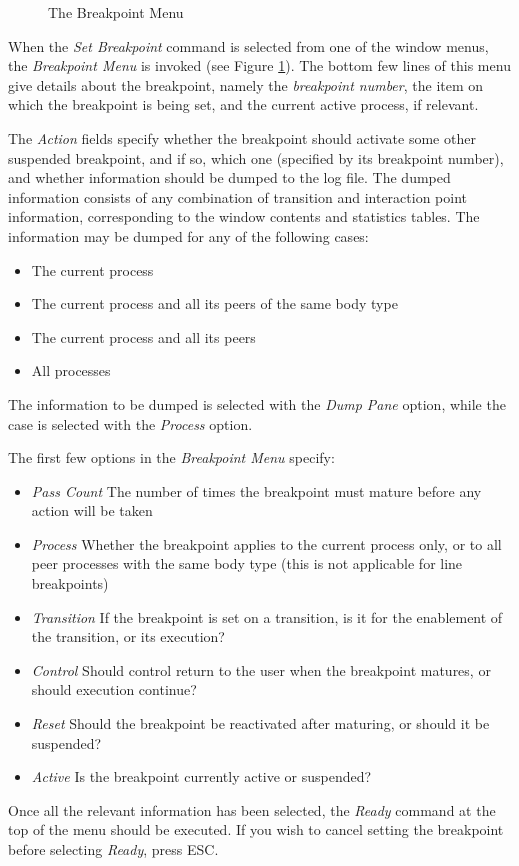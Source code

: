 \begin{figure}
\vspace{15cm}
\caption {\label {brkpt-menu} The Breakpoint Menu}
\end{figure}
When the {\em Set Breakpoint} command is selected from one of the
window menus, the {\em Breakpoint Menu} is invoked (see Figure
\ref{brkpt-menu}).
The bottom few lines of this menu give details about
the breakpoint, namely the {\em breakpoint number}, the
item on which the breakpoint is being set, and the current active
process, if relevant.

The {\em Action} fields specify whether the
breakpoint should activate some other suspended breakpoint, and if
so, which one (specified by its breakpoint number), and 
whether information should be dumped to the log file.
The dumped information consists of any combination of transition and
interaction point information, corresponding to the window contents
and statistics tables. The information may be dumped for any of the
following cases:
\begin{itemize}
\item The current process
\item The current process and all its peers of the same body type
\item The current process and all its peers
\item All processes
\end {itemize}
The information to be dumped is selected with the {\em Dump Pane}
option, while the case is selected with the {\em Process} option.

The first few options in the {\em Breakpoint Menu} specify:

\begin{itemize}
\item {\em Pass Count} The number of times the breakpoint must mature
before any action will be taken
\item {\em Process} Whether the breakpoint applies to the current
process only, or to all peer processes with the same body type (this
is not applicable for line breakpoints)
\item {\em Transition} If the breakpoint is set on a transition, is
it for the enablement of the transition, or its execution?
\item {\em Control} Should control return to the user when the breakpoint
matures, or should execution continue?
\item {\em Reset} Should the breakpoint be reactivated after
maturing, or should it be suspended?
\item {\em Active} Is the breakpoint currently active or suspended?
\end {itemize}
Once all the relevant information has been selected, the {\em Ready}
command at the top of the menu should be executed. If you wish to
cancel setting the breakpoint before selecting {\em Ready}, press
ESC.

